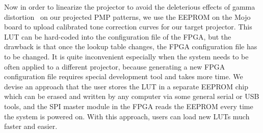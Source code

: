 \documentclass[]{spie}  %
\begin{document}
Now in order to linearize the projector to avoid the deleterious effects of gamma distortion~\cite{gamm10} on our projected PMP patterns, we use the EEPROM on the Mojo board to upload calibrated tone correction curves for our target projector.
This LUT can be hard-coded into the configuration file of the FPGA, but the drawback is that once the lookup table changes, the FPGA configuration file has to be changed. It is quite inconvenient especially when the system needs to be often applied to a different projector, because generating a new FPGA configuration file requires special development tool and takes more time. We devise an approach that the user stores the LUT in a separate EEPROM chip which can be erased and written by any computer via some general serial or USB tools, and the SPI master module in the FPGA reads the EEPROM every time the system  is powered on. With this approach, users can load new LUTs much faster and easier.
\end{document}
